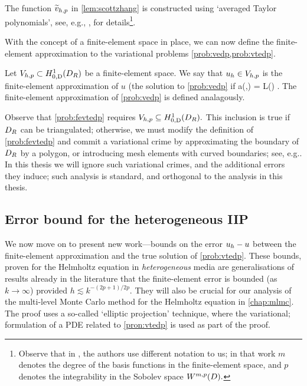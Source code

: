The function $\widetilde{v}_{h,p}$ in \cref{lem:scottzhang} is constructed using `averaged Taylor polynomials', see, e.g., \cite{ScZh:90},\cite[Section 4.4]{BrSc:08} for details\footnote{Observe that in \cite{BrSc:08}, the authors use different notation to us; in that work $m$ denotes the degree of the basis functions in the finite-element space, and $p$ denotes the integrability in the Sobolev space $\WmpD.$}.
    \ere

    With the concept of a finite-element space in place, we can now define the finite-element approximation to the variational problems \cref{prob:vedp,prob:vtedp}.

    \label{prob:fevtedp}
    Let $\Vhp \subset \HozDDR$ be a finite-element space. We say that $u_{h} \in V_{h,p}$ is the finite-element approximation of $u$ (the solution to \cref{prob:vedp} if
    \beqs
    a(\uh,\vh) = L(\vh) \tforall \vh \in \Vhp.
    The finite-element approximation of \cref{prob:vedp} is defined analagously.
    \eeqs
    \eprob

    Observe that \cref{prob:fevtedp} requires $\Vhp \subseteq \HozDDR.$ This inclusion is true if $D_{R}$ can be triangulated; otherwise, we must modify the definition of \cref{prob:fevtedp} and commit a variational crime by approximating the boundary of $D_{R}$ by a polygon, or introducing mesh elements with curved boundaries; see, e.g.. In this thesis we will ignore such variational crimes, and the additional errors they induce; such analysis is standard, and orthogonal to the analysis in this thesis.
    \ere
    

    \subsection{Error bound for the heterogeneous IIP}\label{sec:errbound}

    We now move on to present new work---bounds on the error $u_{h}-u$ between the finite-element approximation and the true solution of \cref{prob:vtedp}. These bounds, proven for the Helmholtz equation in \emph{heterogeneous} media are generalisations of results already in the literature that the finite-element error is bounded (as $k\rightarrow \infty$) provided $h \lesssim k^{-(2p+1)/2p}$. They will also be crucial for our analysis of the multi-level Monte Carlo method for the Helmholtz equation in \cref{chap:mlmc}. The proof uses a so-called `elliptic projection' technique, where the variational; formulation of a PDE related to \cref{pron:vtedp} is used as part of the proof. 

